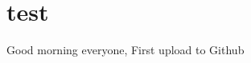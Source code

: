 \documentclass[]{article}
\title{}
\author{Milton Zhou}
\date{}
\begin{document}
\maketitle
\section*{test}
Good morning everyone, First upload to Github


\end{document}

